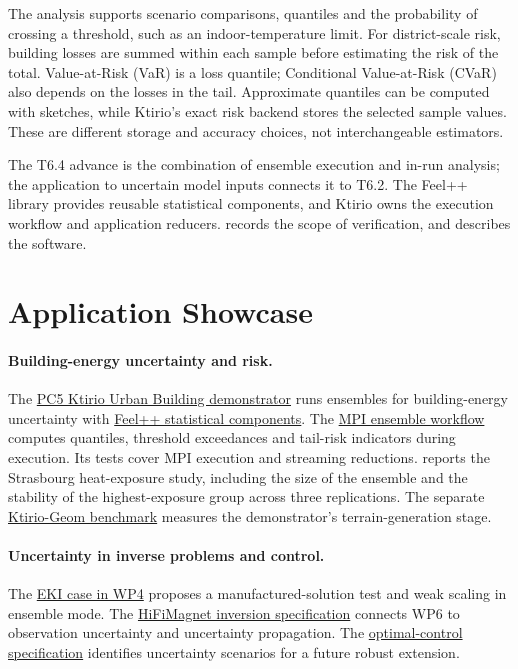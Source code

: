 The analysis supports scenario comparisons, quantiles and the probability
of crossing a threshold, such as an indoor-temperature limit. For
district-scale risk, building losses are summed within each sample
before estimating the risk of the total. Value-at-Risk (VaR) is a loss
quantile; Conditional Value-at-Risk (CVaR) also depends on the losses in
the tail. Approximate quantiles can be computed with sketches, while
Ktirio's exact risk backend stores the selected sample values. These
are different storage and accuracy choices, not interchangeable estimators.

The T6.4 advance is the combination of ensemble execution and in-run
analysis; the application to uncertain model inputs connects it to T6.2.
The Feel++ library provides reusable statistical components, and Ktirio
owns the execution workflow and application reducers.
 records the scope of verification, and
 describes the software.

\section{Application Showcase}
\label{sec:wp6:applications}

\paragraph{Building-energy uncertainty and risk.}
The \hyperref[sec:pc5:ktirio-urban-building]{PC5 Ktirio Urban Building
demonstrator} runs ensembles for building-energy uncertainty with
\hyperref[sec:Feelpp:implementation-2026:stats]{Feel++ statistical
components}. The \hyperref[sec:wp6:ensemble-streaming]{MPI ensemble
workflow} computes quantiles, threshold exceedances and tail-risk
indicators during execution. Its tests cover MPI execution and
streaming reductions.  reports the
Strasbourg heat-exposure study, including the size of the ensemble and
the stability of the highest-exposure group across three replications.
The separate \hyperref[sec:app:specs:app-feelpp-ktirio-geom]{Ktirio-Geom
benchmark} measures the demonstrator's terrain-generation stage.

\paragraph{Uncertainty in inverse problems and control.}
The \hyperref[sec:app:specs:app-eki]{EKI case in WP4} proposes a
manufactured-solution test and weak scaling in ensemble mode.
The \hyperref[sec:app:specs:app-feelpp-hifimagnet-inverse]{HiFiMagnet
inversion specification} connects WP6 to observation uncertainty and
uncertainty propagation. The
\hyperref[sec:app:specs:app-feelpp-hifimagnet-optcontrol]{optimal-control
specification} identifies uncertainty scenarios for a future robust
extension.

